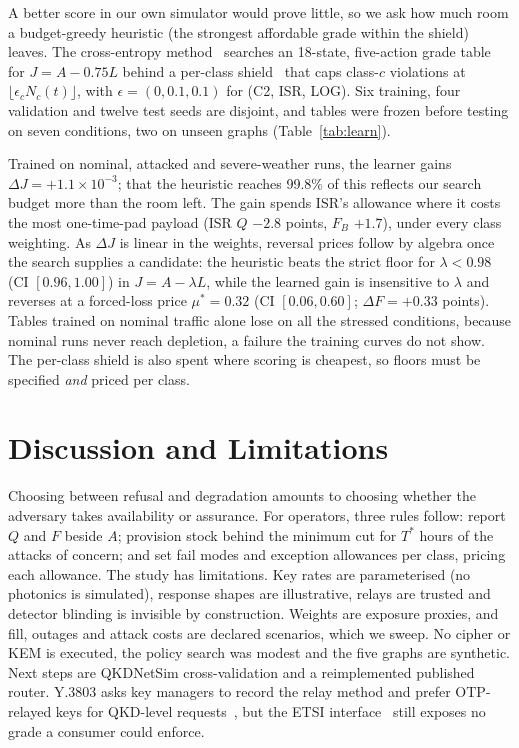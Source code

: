 \documentclass[conference,a4paper]{IEEEtran}
\begin{document}
A better score in our own simulator would prove little, so we ask how much room a
budget-greedy heuristic (the strongest affordable grade within the shield) leaves. The
cross-entropy method~\cite{cem} searches an 18-state, five-action grade table for
$J=A-0.75L$ behind a per-class shield~\cite{shield} that caps class-$c$ violations at
$\lfloor\epsilon_cN_c(t)\rfloor$, with $\epsilon=(0,0.1,0.1)$ for (C2, ISR, LOG). Six
training, four validation and twelve test seeds are disjoint, and tables were frozen
before testing on seven conditions, two on unseen graphs (Table~\ref{tab:learn}).

Trained on nominal, attacked and severe-weather runs, the learner gains $\Delta
J=+1.1\times10^{-3}$; that the heuristic reaches 99.8\% of this reflects our search
budget more than the room left. The gain spends ISR's allowance where it costs the
most one-time-pad payload (ISR $Q$ $-2.8$ points, $F_B$ $+1.7$), under every class
weighting. As $\Delta J$ is linear in the weights, reversal prices follow by algebra
once the search supplies a candidate: the heuristic beats the strict floor for
$\lambda<0.98$ (CI $[0.96,1.00]$) in $J=A-\lambda L$, while the learned gain is
insensitive to $\lambda$ and reverses at a forced-loss price $\mu^\ast=0.32$ (CI
$[0.06,0.60]$; $\Delta F=+0.33$ points). Tables trained on nominal traffic alone lose
on all the stressed conditions, because nominal runs never reach depletion, a failure
the training curves do not show. The per-class shield is also spent where scoring is
cheapest, so floors must be specified \emph{and} priced per class.

\section{Discussion and Limitations}
Choosing between refusal and degradation amounts to choosing whether the adversary
takes availability or assurance. For operators, three rules follow: report
$Q$ and $F$ beside $A$; provision stock behind the minimum cut for $T^\ast$ hours of
the attacks of concern; and set fail modes and exception allowances per class, pricing
each allowance. The study has limitations. Key rates are parameterised (no photonics is simulated), response shapes are illustrative, relays are trusted and detector
blinding is invisible by construction. Weights are exposure proxies, and fill, outages
and attack costs are declared scenarios, which we sweep. No cipher or
KEM is executed, the policy search was modest and the five graphs are synthetic. Next
steps are QKDNetSim cross-validation and a reimplemented published router. Y.3803 asks
key managers to record the relay method and prefer OTP-relayed keys for QKD-level
requests~\cite{itu3803}, but the ETSI interface~\cite{etsi014} still exposes no grade
a consumer could enforce.
\end{document}
